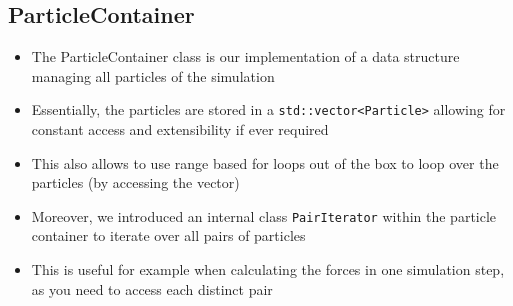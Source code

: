 \documentclass{article}
\begin{document}
\subsection{ParticleContainer}
\label{sec:Refactoring:ParticleContainer}
\begin{itemize}
    \item The ParticleContainer class is our implementation of a data structure managing all particles of the simulation
    \item Essentially, the particles are stored in a \verb|std::vector<Particle>| allowing for constant access and extensibility if ever required
    \item This also allows to use range based for loops out of the box to loop over the particles (by accessing the vector)
    \item Moreover, we introduced an internal class \verb|PairIterator| within the particle container to iterate over all pairs of particles
    \item This is useful for example when calculating the forces in one simulation step, as you need to access each distinct pair
\end{itemize}
\end{document}
